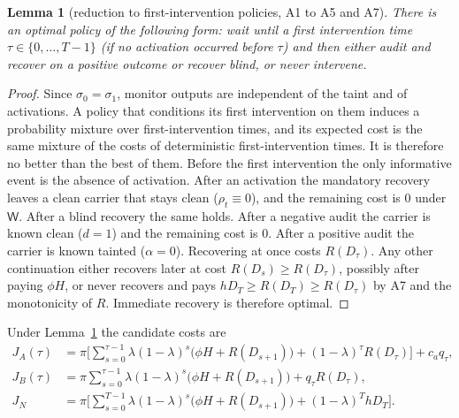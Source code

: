 \documentclass[11pt]{article}
\newtheorem{lemma}{Lemma}
\theoremstyle{definition}
\newcommand{\Wa}{\mathsf{W}}
\begin{document}
\begin{lemma}[reduction to first-intervention policies, A1 to A5 and A7]\label{lem:reduce}
There is an optimal policy of the following form: wait until a first intervention time
$\tau\in\{0,\dots,T-1\}$ (if no activation occurred before $\tau$) and then either audit and recover on a
positive outcome or recover blind, or never intervene.
\end{lemma}
\begin{proof}
Since $\sigma_0=\sigma_1$, monitor outputs are independent of the taint and of activations. A policy that
conditions its first intervention on them induces a probability mixture over first-intervention times, and
its expected cost is the same mixture of the costs of deterministic first-intervention times. It is therefore no
better than the best of them. Before the first intervention the only informative event is the absence of
activation. After an activation the mandatory recovery leaves a clean carrier that stays clean
($\rho_t\equiv0$), and the remaining cost is $0$ under $\Wa$. After a blind recovery the same holds. After a
negative audit the carrier is known clean ($d=1$) and the remaining cost is $0$. After a positive audit the
carrier is known tainted ($\alpha=0$). Recovering at once costs $R(D_\tau)$. Any other continuation either
recovers later at cost $R(D_s)\ge R(D_\tau)$, possibly after paying $\phi H$, or never recovers and pays
$hD_T\ge R(D_T)\ge R(D_\tau)$ by A7 and the monotonicity of $R$. Immediate recovery is therefore optimal.
\end{proof}

Under Lemma~\ref{lem:reduce} the candidate costs are
\begin{align*}
J_A(\tau)&=\pi\Big[\sum_{s=0}^{\tau-1}\lambda(1-\lambda)^s\big(\phi H+R(D_{s+1})\big)+(1-\lambda)^\tau R(D_\tau)\Big]+c_aq_\tau,\\
J_B(\tau)&=\pi\sum_{s=0}^{\tau-1}\lambda(1-\lambda)^s\big(\phi H+R(D_{s+1})\big)+q_\tau R(D_\tau),\\
J_N&=\pi\Big[\sum_{s=0}^{T-1}\lambda(1-\lambda)^s\big(\phi H+R(D_{s+1})\big)+(1-\lambda)^ThD_T\Big].
\end{align*}
\end{document}
